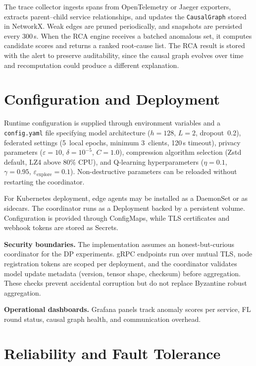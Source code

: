 The trace collector ingests spans from OpenTelemetry or Jaeger exporters,
extracts parent--child service relationships, and updates the
\texttt{CausalGraph} stored in NetworkX. Weak edges are pruned periodically, and
snapshots are persisted every 300\,s. When the RCA engine receives a batched
anomalous set, it computes candidate scores and returns a ranked root-cause
list. The RCA result is stored with the alert to preserve auditability, since
the causal graph evolves over time and recomputation could produce a different
explanation.

\section{Configuration and Deployment}
\label{sec:design_config}

Runtime configuration is supplied through environment variables and a
\texttt{config.yaml} file specifying model architecture ($h{=}128$, $L{=}2$,
dropout~0.2), federated settings (5~local epochs, minimum 3~clients,
120\,s timeout), privacy parameters ($\varepsilon{=}10$, $\delta{=}10^{-5}$,
$C{=}1.0$), compression algorithm selection (Zstd default, LZ4 above 80\% CPU),
and Q-learning hyperparameters ($\eta{=}0.1$, $\gamma{=}0.95$,
$\varepsilon_{\text{explore}}{=}0.1$). Non-destructive parameters can be
reloaded without restarting the coordinator.

For Kubernetes deployment, edge agents may be installed as a DaemonSet or as
sidecars. The coordinator runs as a Deployment backed by a persistent volume.
Configuration is provided through ConfigMaps, while TLS certificates and
webhook tokens are stored as Secrets.

\textbf{Security boundaries.} The implementation assumes an honest-but-curious
coordinator for the DP experiments. gRPC endpoints run over mutual TLS, node
registration tokens are scoped per deployment, and the coordinator validates
model update metadata (version, tensor shape, checksum) before aggregation.
These checks prevent accidental corruption but do not replace Byzantine robust
aggregation.

\textbf{Operational dashboards.} Grafana panels track anomaly scores per
service, FL round status, causal graph health, and communication overhead.

\section{Reliability and Fault Tolerance}
\label{sec:reliability_overview}


